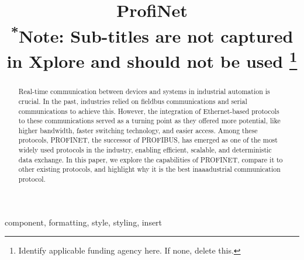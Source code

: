 \documentclass[conference]{IEEEtran}
\begin{document}
\title{ProfiNet\\
{\footnotesize \textsuperscript{*}Note: Sub-titles are not captured in Xplore and
should not be used}
\thanks{Identify applicable funding agency here. If none, delete this.}
}

\author{
\and
{}
\and
{}
}

\maketitle

\begin{abstract}
Real-time communication between devices and systems in industrial automation is crucial. In the past, industries relied on fieldbus communications and serial communications to achieve this. However, the integration of Ethernet-based protocols to these communications served as a turning point as they offered more potential, like higher bandwidth, faster switching technology, and easier access. Among these protocols, PROFINET, the successor of PROFIBUS, has emerged as one of the most widely used protocols in the industry, enabling efficient, scalable, and deterministic data exchange. In this paper, we explore the capabilities of PROFINET, compare it to other existing protocols, and highlight why it is the best inaaadustrial communication protocol.

\end{abstract}

\begin{IEEEkeywords}
component, formatting, style, styling, insert
\end{IEEEkeywords}
\end{document}
